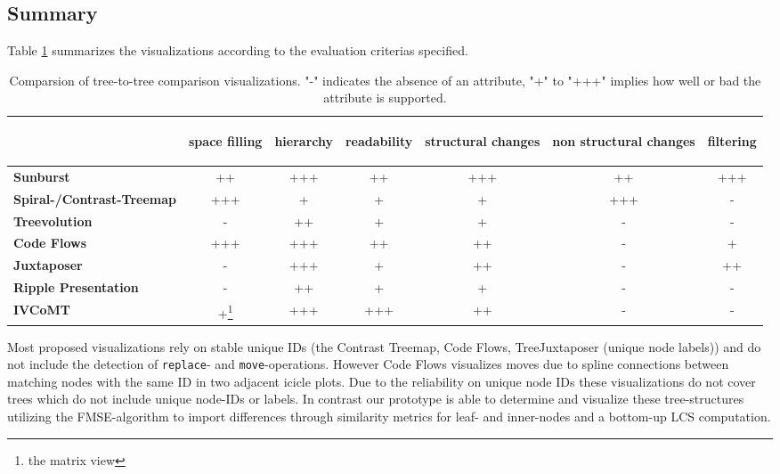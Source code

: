 \subsection{Summary}
Table \ref{chap5:comparsion} summarizes the visualizations according to the evaluation criterias specified.

\begin{table}[tb]
\centering 
\begin{tabular}[r]{|l|c|c|c|c|c|c|} 
\hline
& \begin{sideways}\textbf{space filling}\end{sideways} & \begin{sideways}\textbf{hierarchy}\end{sideways} & \begin{sideways}\textbf{readability}\end{sideways} & \begin{sideways}\textbf{structural changes}\end{sideways} & \begin{sideways}\textbf{non structural changes}\end{sideways} & \begin{sideways}\textbf{filtering}\end{sideways}\\
\hline
\hline
\textbf{Sunburst} & ++ & +++ & ++ & +++ & ++ & +++\\
\hline
\textbf{Spiral-/Contrast-Treemap} & +++ & + & + & + & +++ & -\\
\hline
\textbf{Treevolution} & - & ++ & + & + & - & -\\
\hline
\textbf{Code Flows} & +++ & +++ & ++ & ++ & - & +\\
\hline
\textbf{Juxtaposer} & - & +++ & + & ++ & - & ++ \\
\hline
\textbf{Ripple Presentation} & - & ++ & + & + & - & -\\
\hline
\textbf{IVCoMT} & +\footnote{the matrix view} & +++ & +++ & ++ & - & - \\
\hline
\end{tabular}
\label{chap5:comparsion}
\vspace{0.5em} 
\caption{Comparsion of tree-to-tree comparison visualizations. "-" indicates the absence of an attribute, "+" to "+++" implies how well or bad the attribute is supported.}
\end{table}

Most proposed visualizations rely on stable unique IDs (the Contrast Treemap\cite{tu2007visualizing}, Code Flows\cite{telea2008code}, TreeJuxtaposer\cite{munzner2003treejuxtaposer} (unique node labels)) and do not include the detection of \texttt{replace}- and \texttt{move}-operations. However Code Flows visualizes moves due to spline connections between matching nodes with the same ID in two adjacent icicle plots. Due to the reliability on unique node IDs these visualizations do not cover trees which do not include unique node-IDs or labels. In contrast our prototype is able to determine and visualize these tree-structures utilizing the FMSE-algorithm to import differences through similarity metrics for leaf- and inner-nodes and a bottom-up LCS computation.

